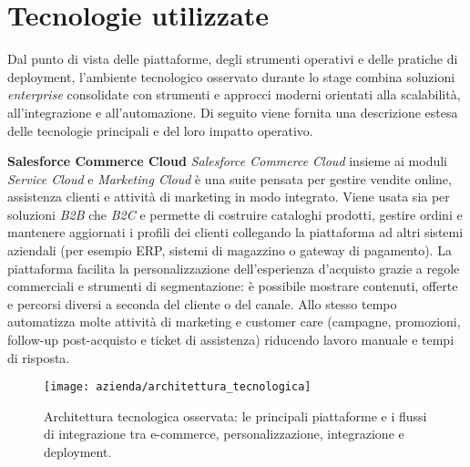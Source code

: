 \section{Tecnologie utilizzate}

Dal punto di vista delle piattaforme, degli strumenti operativi e delle pratiche di deployment, l’ambiente tecnologico osservato durante lo stage combina soluzioni \emph{enterprise} 
consolidate con strumenti e approcci moderni orientati alla scalabilità, all’integrazione e all’automazione. 
Di seguito viene fornita una descrizione estesa delle tecnologie principali e del loro impatto operativo.

\medskip
\noindent\textbf{Salesforce Commerce Cloud}
\emph{Salesforce Commerce Cloud} insieme ai moduli \emph{Service Cloud} e \emph{Marketing Cloud} è una suite pensata per gestire vendite online, assistenza clienti e 
attività di marketing in modo integrato. Viene usata sia per soluzioni \emph{B2B} che \emph{B2C} e permette di costruire cataloghi prodotti, gestire ordini e mantenere 
aggiornati i profili dei clienti collegando la piattaforma ad altri sistemi aziendali (per esempio ERP, sistemi di magazzino o gateway di pagamento).
La piattaforma facilita la personalizzazione dell’esperienza d’acquisto grazie a regole commerciali e strumenti di segmentazione: è possibile mostrare contenuti, 
offerte e percorsi diversi a seconda del cliente o del canale. Allo stesso tempo automatizza molte attività di marketing e customer care (campagne, promozioni, 
follow-up post-acquisto e ticket di assistenza) riducendo lavoro manuale e tempi di risposta.

\begin{figure}[htbp]
    \centering
    \texttt{[image: azienda/architettura\_tecnologica]}
    \caption{Architettura tecnologica osservata: le principali piattaforme e i flussi di integrazione tra e-commerce, personalizzazione, integrazione e deployment.}
    \label{fig:architettura_tecnologica}
\end{figure}


